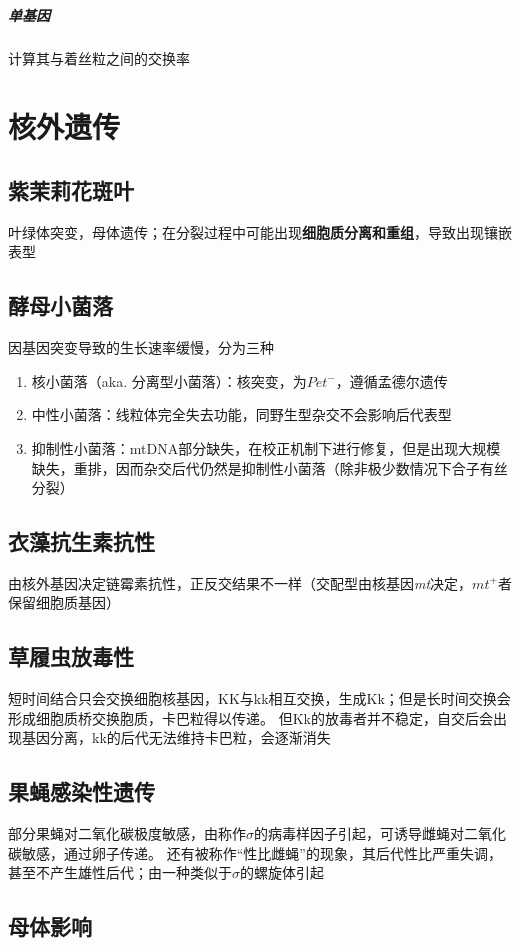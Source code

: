 \documentclass[a4paper, 12pt]{report}
\begin{document}
  \paragraph{单基因}
  计算其与着丝粒之间的交换率
  \chapter{核外遗传}
  \section{紫茉莉花斑叶}
  叶绿体突变，母体遗传；在分裂过程中可能出现\textbf{细胞质分离和重组}，导致出现镶嵌表型
  \section{酵母小菌落}
  因基因突变导致的生长速率缓慢，分为三种
  \begin{enumerate}
    \item 核小菌落（aka. 分离型小菌落）：核突变，为\(Pet^-\)，遵循孟德尔遗传
    \item 中性小菌落：线粒体完全失去功能，同野生型杂交不会影响后代表型
    \item 抑制性小菌落：mtDNA部分缺失，在校正机制下进行修复，但是出现大规模缺失，重排，因而杂交后代仍然是抑制性小菌落（除非极少数情况下合子有丝分裂）
  \end{enumerate}
  \section{衣藻抗生素抗性}
  由核外基因决定链霉素抗性，正反交结果不一样（交配型由核基因\textit{mt}决定，\(mt^+\)者保留细胞质基因）
  \section{草履虫放毒性}
  短时间结合只会交换细胞核基因，KK与kk相互交换，生成Kk；但是长时间交换会形成细胞质桥交换胞质，卡巴粒得以传递。
  但Kk的放毒者并不稳定，自交后会出现基因分离，kk的后代无法维持卡巴粒，会逐渐消失
  \section{果蝇感染性遗传}
  部分果蝇对二氧化碳极度敏感，由称作\(\sigma\)的病毒样因子引起，可诱导雌蝇对二氧化碳敏感，通过卵子传递。
  还有被称作“性比雌蝇”的现象，其后代性比严重失调，甚至不产生雄性后代；由一种类似于\(\sigma\)的螺旋体引起
  \section{母体影响}
\end{document}
